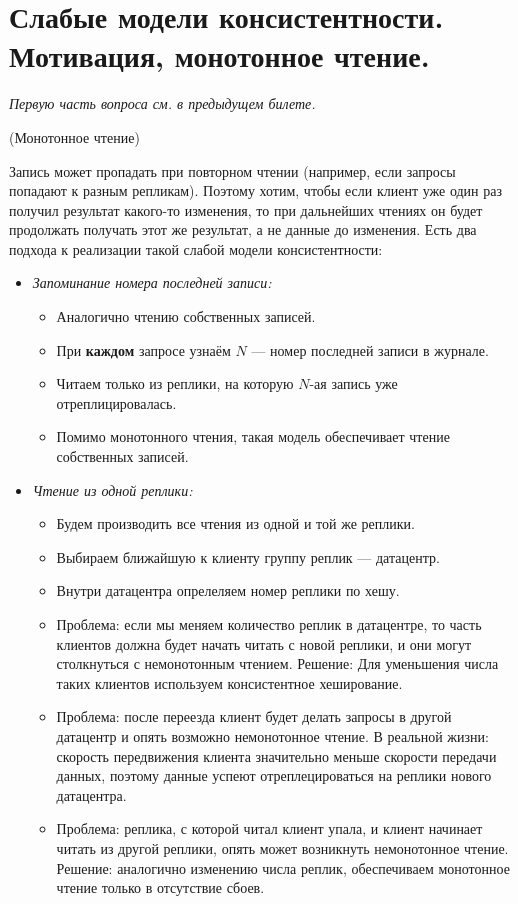 \section{Слабые модели консистентности. Мотивация, монотонное чтение.}

\textit{Первую часть вопроса см. в предыдущем билете.}

\begin{example}(Монотонное чтение)

    Запись может пропадать при повторном чтении (например, если запросы попадают к разным репликам). Поэтому хотим, чтобы если клиент уже один раз получил результат какого-то изменения, то при дальнейших чтениях он будет продолжать получать этот же результат, а не данные до изменения. Есть два подхода к реализации такой слабой модели консистентности:
    \begin{itemize}
        \item \textit{Запоминание номера последней записи:}
        \begin{itemize}
            \item Аналогично чтению собственных записей.
            \item При \textbf{каждом} запросе узнаём $N$ --- номер последней записи в журнале.
            \item Читаем только из реплики, на которую $N$-ая запись уже отреплицировалась.
            \item Помимо монотонного чтения, такая модель обеспечивает чтение собственных записей.
        \end{itemize}

        \item \textit{Чтение из одной реплики:}
        \begin{itemize}
            \item Будем производить все чтения из одной и той же реплики.
            \item Выбираем ближайшую к клиенту группу реплик --- датацентр.
            \item Внутри датацентра опрелеляем номер реплики по хешу.
            \item Проблема: если мы меняем количество реплик в датацентре, то часть клиентов должна будет начать читать с новой реплики, и они могут столкнуться с немонотонным чтением. Решение: Для уменьшения числа таких клиентов используем консистентное хеширование.
            \item Проблема: после переезда клиент будет делать запросы в другой датацентр и опять возможно немонотонное чтение. В реальной жизни: скорость передвижения клиента значительно меньше скорости передачи данных, поэтому данные успеют отреплецироваться на реплики нового датацентра.
            \item Проблема: реплика, с которой читал клиент упала, и клиент начинает читать из другой реплики, опять может возникнуть немонотонное чтение. Решение: аналогично изменению числа реплик, обеспечиваем монотонное чтение только в отсутствие сбоев.
        \end{itemize}
    \end{itemize}

\end{example}
